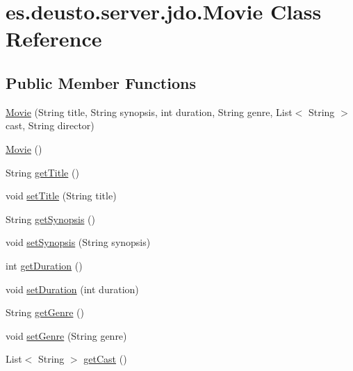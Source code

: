 \hypertarget{classes_1_1deusto_1_1server_1_1jdo_1_1_movie}{}\section{es.\+deusto.\+server.\+jdo.\+Movie Class Reference}
\label{classes_1_1deusto_1_1server_1_1jdo_1_1_movie}
\subsection*{Public Member Functions}
\begin{DoxyCompactItemize}
\item 
\mbox{\hyperlink{classes_1_1deusto_1_1server_1_1jdo_1_1_movie_ab4223192a852a37abd679f4d0a6a11c4}{Movie}} (String title, String synopsis, int duration, String genre, List$<$ String $>$ cast, String director)
\item 
\mbox{\hyperlink{classes_1_1deusto_1_1server_1_1jdo_1_1_movie_a38a85ccc9a3e0298421f456dc713ad88}{Movie}} ()
\item 
String \mbox{\hyperlink{classes_1_1deusto_1_1server_1_1jdo_1_1_movie_aa69d66c8aa0135b6ae9b809cf0692389}{get\+Title}} ()
\item 
void \mbox{\hyperlink{classes_1_1deusto_1_1server_1_1jdo_1_1_movie_ae5ef76349074d7d94803152daacc9e54}{set\+Title}} (String title)
\item 
String \mbox{\hyperlink{classes_1_1deusto_1_1server_1_1jdo_1_1_movie_a3cd6a8dbcfc02f646bb21d212030dbeb}{get\+Synopsis}} ()
\item 
void \mbox{\hyperlink{classes_1_1deusto_1_1server_1_1jdo_1_1_movie_a8bc588baca5c14a900a83d8a0326542c}{set\+Synopsis}} (String synopsis)
\item 
int \mbox{\hyperlink{classes_1_1deusto_1_1server_1_1jdo_1_1_movie_a3c056812ade3ddfa59723e5181c90206}{get\+Duration}} ()
\item 
void \mbox{\hyperlink{classes_1_1deusto_1_1server_1_1jdo_1_1_movie_a045b89a0ae1e637d8944f34c97f8c34e}{set\+Duration}} (int duration)
\item 
String \mbox{\hyperlink{classes_1_1deusto_1_1server_1_1jdo_1_1_movie_a5505376d4003bcfa7603fc1a707e2528}{get\+Genre}} ()
\item 
void \mbox{\hyperlink{classes_1_1deusto_1_1server_1_1jdo_1_1_movie_aae8757b5e3229b6b521a0b8dab606eff}{set\+Genre}} (String genre)
\item 
List$<$ String $>$ \mbox{\hyperlink{classes_1_1deusto_1_1server_1_1jdo_1_1_movie_a6a71a02d7d70dfd2eb18bee0295c9b62}{get\+Cast}} ()

\end{DoxyCompactItemize}
